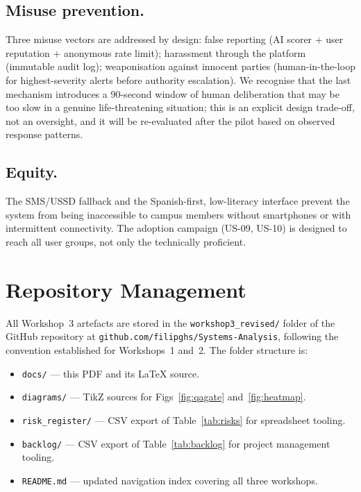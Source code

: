 \documentclass[12pt,a4paper]{article}
\begin{document}
\subsection{Misuse prevention.}
Three misuse vectors are addressed by design: false reporting
(AI scorer + user reputation + anonymous rate limit); harassment
through the platform (immutable audit log); weaponisation against
innocent parties (human-in-the-loop for highest-severity alerts
before authority escalation). We recognise that the last mechanism
introduces a 90-second window of human deliberation that may be
too slow in a genuine life-threatening situation; this is an
explicit design trade-off, not an oversight, and it will be
re-evaluated after the pilot based on observed response patterns.

\subsection{Equity.}
The SMS/USSD fallback and the Spanish-first, low-literacy interface
prevent the system from being inaccessible to campus members without
smartphones or with intermittent connectivity. The adoption campaign
(US-09, US-10) is designed to reach all user groups, not only the
technically proficient.

\section{Repository Management}

All Workshop~3 artefacts are stored in the
\texttt{workshop3\_revised/} folder of the GitHub repository at
\texttt{github.com/filipghs/Systems-Analysis}, following the
convention established for Workshops~1 and~2. The folder structure is:

\begin{itemize}
\item \texttt{docs/} --- this PDF and its \LaTeX{} source.
\item \texttt{diagrams/} --- TikZ sources for Figs~\ref{fig:qagate} and~\ref{fig:heatmap}.
\item \texttt{risk\_register/} --- CSV export of Table~\ref{tab:risks} for spreadsheet tooling.
\item \texttt{backlog/} --- CSV export of Table~\ref{tab:backlog} for project management tooling.
\item \texttt{README.md} --- updated navigation index covering all three workshops.
\end{itemize}
\end{document}
